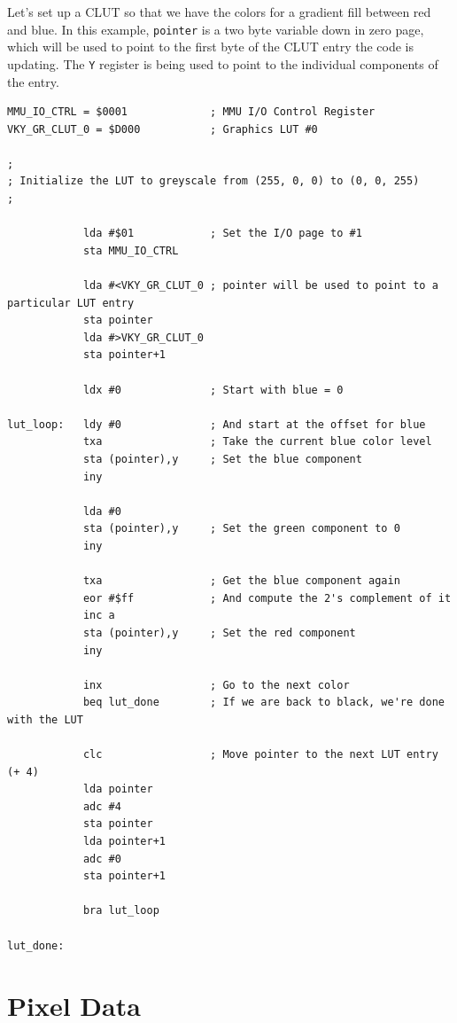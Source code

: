 
Let's set up a CLUT so that we have the colors for a gradient fill between red and blue. In this example, \verb+pointer+ is a two byte variable down in zero page, which will be used to point to the first byte of the CLUT entry the code is updating. The \verb+Y+ register is being used to point to the individual components of the entry.

\begin{verbatim}
MMU_IO_CTRL = $0001             ; MMU I/O Control Register
VKY_GR_CLUT_0 = $D000           ; Graphics LUT #0

;
; Initialize the LUT to greyscale from (255, 0, 0) to (0, 0, 255)
;

            lda #$01            ; Set the I/O page to #1
            sta MMU_IO_CTRL

            lda #<VKY_GR_CLUT_0 ; pointer will be used to point to a particular LUT entry
            sta pointer
            lda #>VKY_GR_CLUT_0
            sta pointer+1

            ldx #0              ; Start with blue = 0

lut_loop:   ldy #0              ; And start at the offset for blue
            txa                 ; Take the current blue color level
            sta (pointer),y     ; Set the blue component
            iny

            lda #0
            sta (pointer),y     ; Set the green component to 0
            iny

            txa                 ; Get the blue component again
            eor #$ff            ; And compute the 2's complement of it
            inc a
            sta (pointer),y     ; Set the red component
            iny

            inx                 ; Go to the next color
            beq lut_done        ; If we are back to black, we're done with the LUT

            clc                 ; Move pointer to the next LUT entry (+ 4)
            lda pointer
            adc #4
            sta pointer
            lda pointer+1
            adc #0
            sta pointer+1

            bra lut_loop

lut_done:
\end{verbatim}

\section*{Pixel Data}

